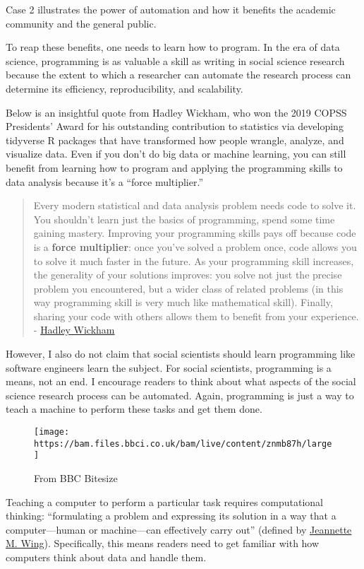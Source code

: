 \documentclass[
]{book}
\begin{document}
Case 2 illustrates the power of automation and how it benefits the academic community and the general public.

To reap these benefits, one needs to learn how to program. In the era of data science, programming is as valuable a skill as writing in social science research because the extent to which a researcher can automate the research process can determine its efficiency, reproducibility, and scalability.

Below is an insightful quote from Hadley Wickham, who won the 2019 COPSS Presidents' Award for his outstanding contribution to statistics via developing tidyverse R packages that have transformed how people wrangle, analyze, and visualize data. Even if you don't do big data or machine learning, you can still benefit from learning how to program and applying the programming skills to data analysis because it's a ``force multiplier.''

\begin{quote}
Every modern statistical and data analysis problem needs code to solve it. You shouldn't learn just the basics of programming, spend some time gaining mastery. Improving your programming skills pays off because code is a \textbf{force multiplier}: once you've solved a problem once, code allows you to solve it much faster in the future. As your programming skill increases, the generality of your solutions improves: you solve not just the precise problem you encountered, but a wider class of related problems (in this way programming skill is very much like mathematical skill). Finally, sharing your code with others allows them to benefit from your experience. - \href{https://imstat.org/2014/12/16/hadley-wickham-impact-the-world-by-being-useful/}{Hadley Wickham}
\end{quote}

However, I also do not claim that social scientists should learn programming like software engineers learn the subject. For social scientists, programming is a means, not an end. I encourage readers to think about what aspects of the social science research process can be automated. Again, programming is just a way to teach a machine to perform these tasks and get them done.

\begin{figure}
\centering
\texttt{[image: https://bam.files.bbci.co.uk/bam/live/content/znmb87h/large]}
\caption{From BBC Bitesize}
\end{figure}

Teaching a computer to perform a particular task requires computational thinking: ``formulating a problem and expressing its solution in a way that a computer---human or machine---can effectively carry out'' (defined by \href{http://www.cs.cmu.edu/afs/cs/usr/wing/www/publications/Wing06.pdf}{Jeannette M. Wing}). Specifically, this means readers need to get familiar with how computers think about data and handle them.
\end{document}
